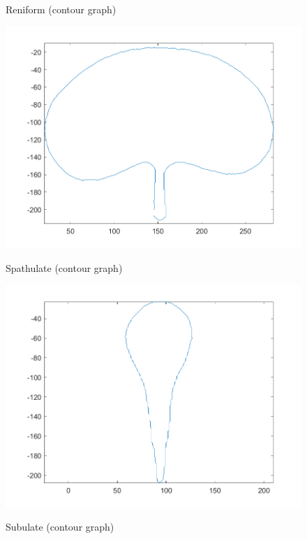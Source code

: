 \documentclass[12pt,english]{article}
\begin{document}
\begin{figure}[!hbt]
\begin{centre}
	\begin{minipage}{0.32\textwidth}
		\caption{Reniform (contour graph)}
		\label{contour:1}
		\includegraphics[width=\textwidth]{../code/contour/contour/reniform}
	\end{minipage}
	\begin{minipage}{0.32\textwidth}
		\caption{Spathulate (contour graph)}
		\label{contour:2}
		\includegraphics[width=\textwidth]{../code/contour/contour/spathulate}
	\end{minipage}
	\begin{minipage}{0.32\textwidth}
		\caption{Subulate (contour graph)}

\end{minipage}
\end{centre}
\end{figure}
\end{document}

